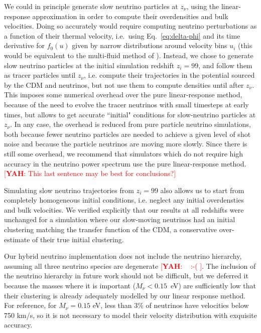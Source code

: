 \documentclass[useAMS, usenatbib]{mnras}
\newcommand{\yah}[1]{{\textcolor{red}{[{\bf YAH}: #1]}}}
\begin{document}
We could in principle generate slow neutrino particles at $z_\nu$, using the linear-response approximation in order to compute their overdensities and bulk velocities. Doing so accurately would require computing neutrino perturbations as a function of their thermal velocity, i.e.~using Eq.~\eqref{eq:delta-phi} and its time derivative for $f_0(u)$ given by narrow distributions around velocity bins $u_i$ (this would be equivalent to the multi-fluid method of \citealt{Dupuy_14}). Instead, we chose to generate slow neutrino particles at the initial simulation redshift $z_i = 99$, and follow them as tracer particles until $z_\nu$, i.e. compute their trajectories in the potential sourced by the CDM and neutrinos, but not use them to compute densities until after $z_\nu$. This imposes some numerical overhead over the pure linear-response method, because of the need to evolve the tracer neutrinos with small timesteps at early times, but allows to get accurate ``initial" conditions for slow-neutrino particles at $z_\nu$. In any case, the overhead is reduced from pure particle neutrino simulations, both because fewer neutrino particles are needed to achieve a given level of shot noise and because the particle neutrinos are moving more slowly. Since there is still some overhead, we recommend that simulators which do not require high accuracy in the neutrino power spectrum use the pure linear-response method. \yah{This last sentence may be best for conclusions?}

Simulating slow neutrino trajectories from $z_i = 99$ also allows us to start from completely homogeneous initial conditions, i.e. neglect any initial overdensties and bulk velocities. We verified explicitly that our results at all redshifts were unchanged for a simulation where our slow-moving neutrinos had an initial clustering matching the transfer function of the CDM, a conservative over-estimate of their true initial clustering.

Our hybrid neutrino implementation does not include the neutrino hierarchy, assuming all three neutrino species are degenerate \yah{~ :-(  }. The inclusion of the neutrino hierarchy in future work should not be difficult, but we deferred it because the masses where it is important ($M_\nu < 0.15$~eV) are sufficiently low that their clustering is already adequately modelled by our linear response method. For reference, for $M_\nu = 0.15$ eV, less than 3\% of neutrinos have velocities below 750 km/s, so it is not necessary to model their velocity distribution with exquisite accuracy.
\end{document}
